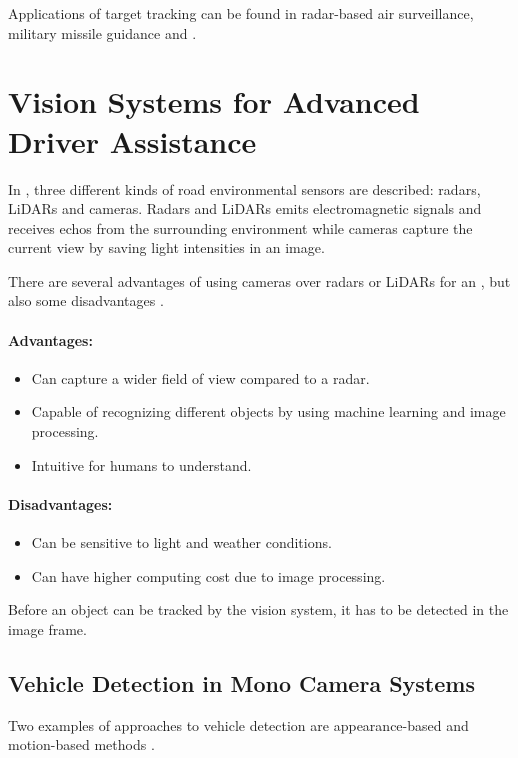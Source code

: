 Applications of target tracking can be found in \eg radar-based air surveillance, military missile guidance and \abbrADAS.

\section{Vision Systems for Advanced Driver Assistance}
In \citep{Sivaraman:2013}, three different kinds of road environmental sensors are described: radars, LiDARs and cameras.
Radars and LiDARs emits electromagnetic signals and receives echos from the surrounding environment while cameras capture the current view by saving light intensities in an image.

There are several advantages of using cameras over radars or LiDARs for an \abbrADAS, but also some disadvantages \cite{Sivaraman:2013}.

\paragraph{Advantages:}
\begin{itemize}
	\item Can capture a wider field of view compared to a radar.
	\item Capable of recognizing different objects by using machine learning and image processing.
	\item Intuitive for humans to understand.
\end{itemize}

\paragraph{Disadvantages:}
\begin{itemize}
	\item Can be sensitive to light and weather conditions.
	\item Can have higher computing cost due to \eg image processing.
\end{itemize}

Before an object can be tracked by the vision system, it has to be detected in the image frame.

\subsection{Vehicle Detection in Mono Camera Systems}
\label{sec:objectdetection}
Two examples of approaches to vehicle detection are appearance-based and motion-based methods \citep{Sivaraman:2013}.

